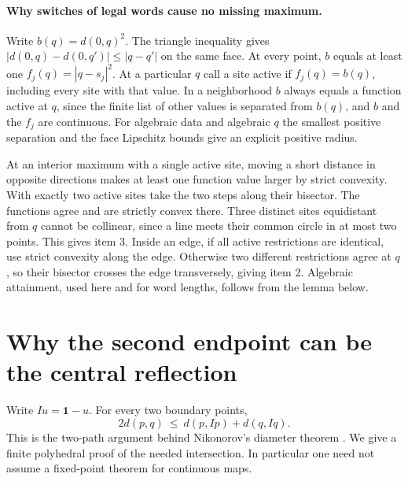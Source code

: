 \documentclass[10pt,letterpaper]{article}
\begin{document}
\paragraph{Why switches of legal words cause no missing maximum.}
Write $b(q)=d(0,q)^2$. The triangle inequality gives
$|d(0,q)-d(0,q')|\le |q-q'|$ on the same face. At every point, $b$
equals at least one $f_j(q)=|q-s_j|^2$. At a particular $q$ call a
site active if $f_j(q)=b(q)$, including every site with that value. In
a neighborhood $b$ always equals a function active at $q$, since the finite
list of other values is separated from $b(q)$, and $b$ and the $f_j$
are continuous. For algebraic data and algebraic $q$ the smallest
positive separation and the face Lipschitz bounds give an explicit
positive radius.

At an interior maximum with a single active site, moving a short
distance in opposite directions makes at least one function value
larger by strict convexity. With exactly two active sites take the
two steps along their bisector. The functions agree and are strictly
convex there. Three distinct sites equidistant from $q$ cannot be
collinear, since a line meets their common circle in at most two
points. This gives item 3. Inside an edge, if all active restrictions
are identical, use strict convexity along the edge. Otherwise two
different restrictions agree at $q$, so their bisector crosses the
edge transversely, giving item 2. Algebraic attainment, used here and
for word lengths, follows from the lemma below.


\section{Why the second endpoint can be the central reflection}
\label{sec:central}
Write $Iu=\mathbf 1-u$. For every two boundary points,
\begin{equation}
   2d(p,q)\ \le\ d(p,Ip)+d(q,Iq).
   \label{eq:cross}
\end{equation}
This is the two-path argument behind Nikonorov's diameter theorem
\cite{nik}. We give a finite polyhedral proof of the needed intersection.
In particular one need not assume a fixed-point theorem for continuous maps.
\end{document}
